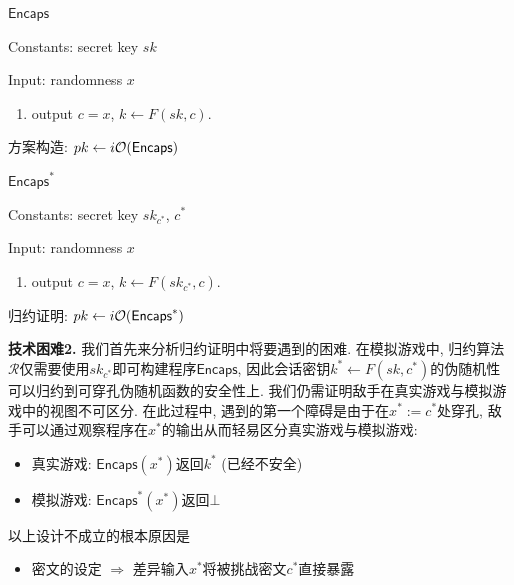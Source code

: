 \begin{framed}
\vspace{-1em}
\begin{center}$\mathsf{Encaps}$\end{center}

\begin{trivlist}
    \item Constants: secret key {$sk$}
    \item Input: randomness $x$ 
        \begin{enumerate}\itemsep 1pt \parskip 0pt \parsep 0pt
            \item output $c = x$, $k \leftarrow F(sk, c)$.
        \end{enumerate}
\end{trivlist}
\vspace{-1em}
\end{framed}
\begin{center}
    方案构造: $pk \leftarrow i\mathcal{O}(\mathsf{Encaps})$
\end{center}


\begin{framed}
\vspace{-1em}
\begin{center}$\mathsf{Encaps}^*$\end{center}
\begin{trivlist}
    \item Constants: secret key {$sk_{c^*}$}, $c^*$ 
    \item Input: randomness $x$ 
        \begin{enumerate}\itemsep 1pt \parskip 0pt \parsep 0pt
            \item output $c = x$, $k \leftarrow F(sk_{c^*}, c)$.
        \end{enumerate}
\end{trivlist}
\vspace{-1em}
\end{framed}
\begin{center}
    归约证明: $pk \leftarrow i\mathcal{O}(\mathsf{Encaps}^*)$
\end{center}

\begin{trivlist}
\item \textbf{技术困难2.} 我们首先来分析归约证明中将要遇到的困难. 
在模拟游戏中, 归约算法$\mathcal{R}$仅需要使用$sk_{c^*}$即可构建程序$\mathsf{Encaps}$, 
因此会话密钥$k^* \leftarrow F(sk, c^*)$的伪随机性可以归约到可穿孔伪随机函数的安全性上. 
我们仍需证明敌手在真实游戏与模拟游戏中的视图不可区分. 
在此过程中, 遇到的第一个障碍是由于在$x^* := c^*$处穿孔, 敌手可以通过观察程序在$x^*$的输出从而轻易区分真实游戏与模拟游戏: 
\begin{itemize}
    \item 真实游戏: $\mathsf{Encaps}(x^*)$返回$k^*$ (已经不安全)
    \item 模拟游戏: $\mathsf{Encaps}^*(x^*)$返回$\bot$
\end{itemize} 
以上设计不成立的根本原因是
\begin{itemize}
    \item 密文的设定 $\Rightarrow$ 差异输入$x^*$将被挑战密文$c^*$直接暴露
\end{itemize}
\end{trivlist}

